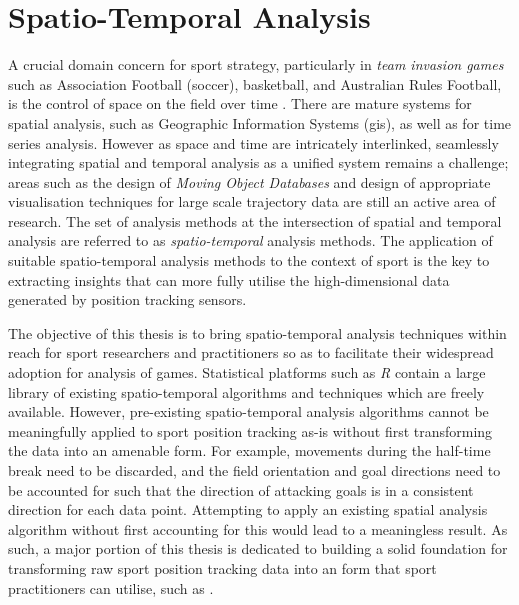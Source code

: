 
\section{Spatio-Temporal Analysis}

A crucial domain concern for sport strategy, particularly in \textit{team invasion games} such as Association Football (soccer), basketball, and Australian Rules Football, is the control of space on the field over time \cite{Coventry2015}. There are mature systems for spatial analysis, such as Geographic Information Systems (\gls{gis}), as well as for time series analysis. However as space and time are intricately interlinked, seamlessly integrating spatial and temporal analysis as a unified system remains a challenge; areas such as the design of \textit{Moving Object Databases} \cite{schneider2009moving} and design of appropriate visualisation techniques for large scale trajectory data \cite{andrienko_visualization_2014} are still an active area of research. The set of analysis methods at the intersection of spatial and temporal analysis are referred to as \textit{spatio-temporal} analysis methods. The application of suitable spatio-temporal analysis methods to the context of sport is the key to extracting insights that can more fully utilise the high-dimensional data generated by position tracking sensors.


The objective of this thesis is to bring spatio-temporal analysis techniques within reach for sport researchers and practitioners so as to facilitate their widespread adoption for analysis of games. Statistical platforms such as \textit{R} contain a large library of existing spatio-temporal algorithms and techniques which are freely available. However, pre-existing spatio-temporal analysis algorithms cannot be meaningfully applied to sport position tracking as-is without first transforming the data into an amenable form. For example, movements during the half-time break need to be discarded, and the field orientation and goal directions need to be accounted for such that the direction of attacking goals is in a consistent direction for each data point. Attempting to apply an existing spatial analysis algorithm without first accounting for this would lead to a meaningless result. As such, a major portion of this thesis is dedicated to building a solid foundation for transforming raw sport position tracking data into an form that sport practitioners can utilise, such as . %

